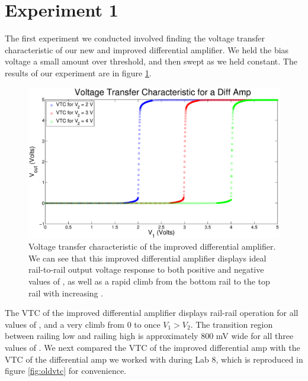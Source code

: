 \section*{Experiment 1}

The first experiment we conducted involved finding the voltage transfer characteristic of our new and improved differential amplifier. We held the bias voltage a small amount over threshold, and then swept \Vone as we held \Vtwo constant. The results of our experiment are in figure \ref{fig:exp1p1}.

\begin{figure}[H]
\centering
\includegraphics[width=\linewidth]{../Figures/Exp1.eps}
\caption{Voltage transfer characteristic of the improved differential amplifier. We can see that this improved differential amplifier displays ideal rail-to-rail output voltage response to both positive and negative values of \Vdm, as well as a rapid climb from the bottom rail to the top rail with increasing \Vdm.}
\label{fig:exp1p1}
\end{figure}
The VTC of the improved differential amplifier displays rail-rail operation for all values of \Vone, and a very climb from 0 to \Vdd once $V_1 > V_2$. The transition region between railing low and railing high is approximately 800 mV wide for all three values of \Vtwo. We next compared the VTC of the improved differential amp with the VTC of the differential amp we worked with during Lab 8, which is reproduced in figure \ref{fig:oldvtc} for convenience.
